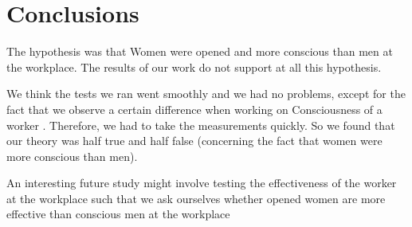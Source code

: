 \section{Conclusions}\label{Sec:Conc}
The  hypothesis was that Women were opened and more conscious than men at the workplace. The  results of our work  do not  support at all this hypothesis.

We think the tests we ran went  smoothly and we had no problems, except for the fact that we observe a certain difference when working on Consciousness of a worker . Therefore, we had to take the measurements quickly. So we found that our theory was half true and half false (concerning the fact that women were more conscious than men).

An interesting future study might involve testing the effectiveness of the worker at the workplace such that we ask ourselves whether opened women are more effective than conscious men at the workplace

 

 
  

